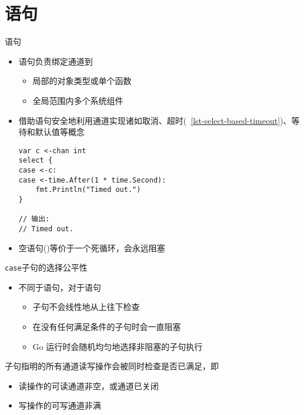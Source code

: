 \section{\select 语句}
\begin{frame}[fragile]{\select 语句}
    \begin{itemize}
        \item \select 语句负责绑定通道到
            \begin{itemize}
                \item 局部的对象类型或单个函数
                \item 全局范围内多个系统组件
            \end{itemize}
        \item 借助\select 语句安全地利用通道实现诸如\alert{取消}、\alert{超时}(\lstlistingname~\ref{lst-select-based-timeout})、\alert{等待}和\alert{默认值}等概念
\begin{lstlisting}[caption={基于\select 实现超时退出},label=lst-select-based-timeout]
var c <-chan int
select {
case <-c:
case <-time.After(1 * time.Second):
    fmt.Println("Timed out.")
}

// 输出:
// Timed out.
\end{lstlisting}
        \item<2-> \textcolor{example}{空\select 语句()等价于一个死循环，会永远阻塞}
    \end{itemize}

    
\end{frame}

\begin{frame}{\texttt{case}子句的选择公平性}
    \begin{itemize}
        \item 不同于语句，对于\select 语句
            \begin{itemize}
                \item {}子句不会线性地从上往下检查
                \item 在没有任何满足条件的子句时会一直阻塞
                \item Go 运行时会随机均匀地选择非阻塞的子句执行
            \end{itemize}
    \end{itemize}

    \bigskip
    子句指明的所有通道读写操作会被同时检查是否已满足，即
    \begin{itemize}
        \item 读操作的可读通道非空，或通道已关闭 
        \item 写操作的可写通道非满
    \end{itemize}
\end{frame}

